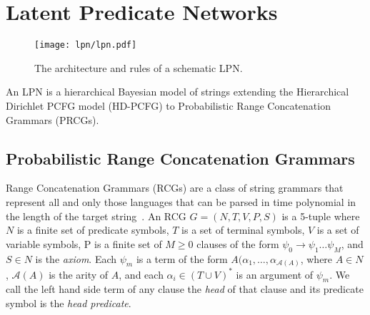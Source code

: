 \documentclass[10pt, twocolumn]{article}
\begin{document}

\section{Latent Predicate Networks}

\begin{figure}[t]
		\texttt{[image: lpn/lpn.pdf]}
		\caption{The architecture and rules of a schematic LPN.}
		\label{fig:architecture}
\end{figure}

An LPN is a hierarchical Bayesian model of strings
extending the Hierarchical Dirichlet PCFG model (HD-PCFG) to
Probabilistic Range Concatenation Grammars (PRCGs). 

\subsection{Probabilistic Range Concatenation Grammars}
Range Concatenation Grammars (RCGs) are a class of string grammars
that represent all and only those languages that can be parsed in time
polynomial in the length of the target
string~\cite{boullier2005range}. An RCG $G=(N, T, V, P, S)$ is a
5-tuple where $N$ is a finite set of predicate symbols, $T$ is a set
of terminal symbols, $V$ is a set of variable symbols, P is a finite
set of $M \geq 0$ clauses of the form $\psi_0 \rightarrow \psi_1 \dots
\psi_M$, and $S \in N$ is the \emph{axiom}. Each $\psi_m$ is a term of
the form $A(\alpha_1, \dots, \alpha_{\mathcal{A}(A)}$, where $A \in
N$, $\mathcal{A}(A)$ is the arity of $A$, and each $\alpha_i \in (T
\cup V)^*$ is an argument of $\psi_m$. We call the left hand side term
of any clause the \emph{head} of that clause and its predicate symbol
is the \emph{head predicate}.

\end{document}
